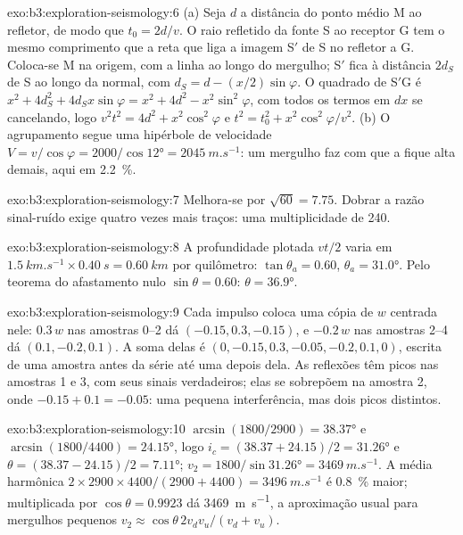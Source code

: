 \begin{solution}{exo:b3:exploration-seismology:6}
(a) Seja $d$ a distância do ponto médio M ao refletor, de modo que
$t_0 = 2d/v$. O raio refletido da fonte S ao receptor G tem o mesmo
comprimento que a reta que liga a imagem S$'$ de S no refletor a G. Coloca-se M
na origem, com a linha ao longo do mergulho; S$'$ fica à distância $2d_S$ de S ao longo
da normal, com $d_S = d - (x/2)\sin\varphi$. O quadrado de S$'$G é
$x^2 + 4d_S^2 + 4d_Sx\sin\varphi = x^2 + 4d^2 - x^2\sin^2\varphi$, com todos os termos
em $dx$ se cancelando, logo $v^2t^2 = 4d^2 + x^2\cos^2\varphi$ e
$t^2 = t_0^2 + x^2\cos^2\varphi/v^2$. (b) O agrupamento segue uma hipérbole de velocidade
$V = v/\cos\varphi = 2000/\cos\ang{12} = \qty{2045}{m.s^{-1}}$: um mergulho faz com que a
 fique alta demais, aqui em \qty{2.2}{\percent}.
\end{solution}

\begin{solution}{exo:b3:exploration-seismology:7}
Melhora-se por $\sqrt{60} = 7.75$. Dobrar a razão sinal-ruído exige quatro vezes
mais traços: uma multiplicidade de 240.
\end{solution}

\begin{solution}{exo:b3:exploration-seismology:8}
A profundidade plotada $vt/2$ varia em $\qty{1.5}{km.s^{-1}}\times\qty{0.40}{s}
= \qty{0.60}{km}$ por quilômetro: $\tan\theta_a = 0.60$, $\theta_a = \ang{31.0}$.
Pelo teorema do afastamento nulo $\sin\theta = 0.60$: $\theta = \ang{36.9}$.
\end{solution}

\begin{solution}{exo:b3:exploration-seismology:9}
Cada impulso coloca uma cópia de $w$ centrada nele: $0.3\,w$ nas amostras 0--2 dá
$(-0.15, 0.3, -0.15)$, e $-0.2\,w$ nas amostras 2--4 dá $(0.1, -0.2, 0.1)$.
A soma delas é $(0, -0.15, 0.3, -0.05, -0.2, 0.1, 0)$, escrita de uma amostra
antes da série até uma depois dela. As reflexões têm picos nas amostras 1 e 3, com
seus sinais verdadeiros; elas se sobrepõem na amostra 2, onde $-0.15 + 0.1 = -0.05$: uma
pequena interferência, mas dois picos distintos.
\end{solution}

\begin{solution}{exo:b3:exploration-seismology:10}
$\arcsin(1800/2900) = \ang{38.37}$ e $\arcsin(1800/4400) = \ang{24.15}$, logo
$i_c = (38.37 + 24.15)/2 = \ang{31.26}$ e $\theta = (38.37 - 24.15)/2 =
\ang{7.11}$; $v_2 = 1800/\sin\ang{31.26} = \qty{3469}{m.s^{-1}}$. A
média harmônica $2\times2900\times4400/(2900 + 4400) = \qty{3496}{m.s^{-1}}$ é
\qty{0.8}{\percent} maior; multiplicada por $\cos\theta = 0.9923$ dá
\qty{3469}{m.s^{-1}}, a aproximação usual para mergulhos pequenos
$v_2 \approx \cos\theta\,2v_dv_u/(v_d + v_u)$.
\end{solution}

